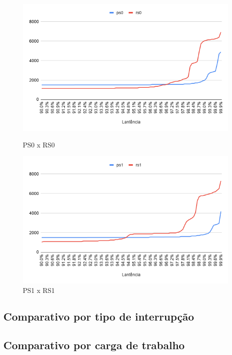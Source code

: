 \begin{figure}[H]
  \centering
  \begin{minipage}[b]{0.4\textwidth}
    \includegraphics[width=\textwidth]{graficos/ps0-rs0.png}
    \caption{PS0 x RS0}
    \label{tableau}
  \end{minipage}
  \hfill
  \begin{minipage}[b]{0.4\textwidth}
    \includegraphics[width=\textwidth]{graficos/ps1-rs1.png}
    \caption{PS1 x RS1}
    \label{tableau}
  \end{minipage}
\end{figure}


\subsection{Comparativo por tipo de interrupção}
\subsection{Comparativo por carga de trabalho}